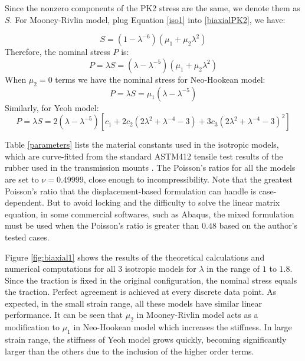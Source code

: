 Since the nonzero components of the PK2 stress are the same, we denote them as $S$. For Mooney-Rivlin model, plug Equation \ref{iso1} into \ref{biaxialPK2}, we have:

\begin{equation}
S = (1 - {\lambda}^{-6})(\mu_1 + \mu_2{\lambda}^2)
\end{equation}
Therefore, the nominal stress $P$ is:
\begin{equation}
P = \lambda S =  (\lambda - {\lambda}^{-5})(\mu_1 + \mu_2{\lambda}^2)
\end{equation}
When $\mu_2 = 0$ terms we have the nominal stress for Neo-Hookean model:
\begin{equation}
P = \lambda S =  \mu_1(\lambda - {\lambda}^{-5})
\end{equation}
Similarly, for Yeoh model:
\begin{equation}
P = \lambda S = 2(\lambda - {\lambda}^{-5})\left[c_1 + 2c_2(2{\lambda}^2 + {\lambda}^{-4} - 3) + 3c_3(2{\lambda}^2 + {\lambda}^{-4} - 3)^2\right]
\end{equation}



Table \ref{parameters} lists the material constants used in the isotropic models, which are curve-fitted from the standard ASTM412 tensile test results of the rubber used in the transmission mounts \cite{Sharma}. The Poisson's ratios for all the models are set to $\nu = 0.49999$, close enough to incompressibility. Note that the greatest Poisson's ratio that the displacement-based formulation can handle is case-dependent. But to avoid locking and the difficulty to solve the linear matrix equation, in some commercial softwares, such as Abaqus, the mixed formulation must be used when the Poisson's ratio is greater than $0.48$ based on the author's tested cases.

Figure \ref{fig:biaxial1} shows the results of the theoretical calculations and numerical computations for all $3$ isotropic models for $\lambda$ in the range of $1$ to $1.8$. Since the traction is fixed in the original configuration, the nominal stress equals the traction. Perfect agreement is achieved at every discrete data point. As expected, in the small strain range, all these models have similar linear performance. It can be seen that $\mu_2$ in Mooney-Rivlin model acts as a modification to $\mu_1$ in Neo-Hookean model which increases the stiffness. In large strain range, the stiffness of Yeoh model grows quickly, becoming significantly larger than the others due to the inclusion of the higher order terms.



